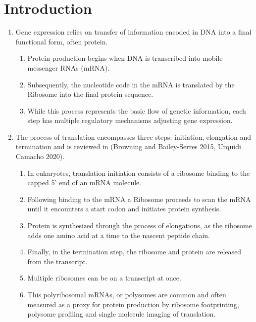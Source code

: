 \documentclass[review]{elsarticle}
\begin{document}
\section{Introduction}

\begin{enumerate}
\item Gene expression relies on transfer of information encoded in DNA into a final functional form, often protein. 
\begin{enumerate}	
  \item Protein production begins when DNA is transcribed into mobile messenger RNAs (mRNA).
  \item Subsequently, the nucleotide code in the mRNA is translated by the Ribosome into the final protein sequence. 
  \item While this process represents the basic flow of genetic information, each step has multiple regulatory mechanisms adjusting gene expression.  
\end{enumerate}

\item The process of translation encompasses three steps: initiation, elongation and termination and is reviewed in (Browning and Bailey-Serres 2015, Urquidi Camacho 2020).
\begin{enumerate}	
  \item In eukaryotes, translation initiation consists of a ribosome binding to the capped 5' end of an mRNA molecule. 
  \item Following binding to the mRNA a Ribosome proceeds to scan the mRNA until it encounters a start codon and initiates protein synthesis.
  \item Protein is synthesized through the process of elongations, as the ribosome adds one amino acid at a time to the nascent peptide chain. 
  \item Finally, in the termination step, the ribosome and protein are released from the transcript.
  \item Multiple ribosomes can be on a transcript at once. 
  \item This polyribosomal mRNAs, or polysomes are common and often measured as a proxy for protein production by ribosome footprinting, polysome profiling and single molecule imaging of translation. 
\end{enumerate}


\end{enumerate}
\end{document}
